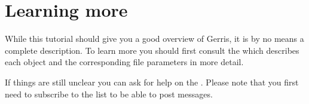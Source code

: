 \documentclass[a4paper]{article}
\begin{document}
\section{Learning more}

While this tutorial should give you a good overview of Gerris, it is by no means a complete description. To learn more you should first consult the  which describes each object and the corresponding file parameters in more detail.

If things are still unclear you can ask for help on the . Please note that you first need to subscribe to the list to be able to post messages.
\end{document}
